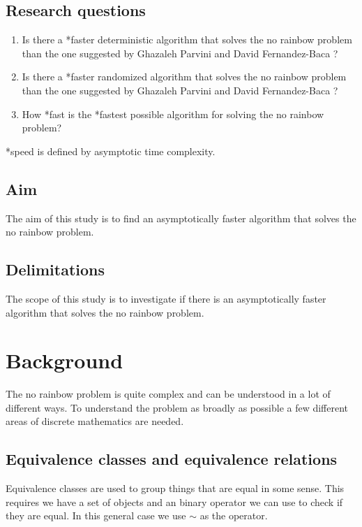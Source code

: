 \documentclass{report}
\begin{document}
\section{Research questions}
\begin{enumerate}
  \item Is there a *faster deterministic algorithm that solves the no rainbow problem than the one suggested by Ghazaleh Parvini and David Fernandez-Baca \cite{sourceNoRainbow}?
  \item Is there a *faster randomized algorithm that solves the no rainbow problem than the one suggested by Ghazaleh Parvini and David Fernandez-Baca \cite{sourceNoRainbow}?
  \item How *fast is the *fastest possible algorithm for solving the no rainbow problem?
\end{enumerate}
*speed is defined by asymptotic time complexity.

\section{Aim}
The aim of this study is to find an asymptotically faster algorithm that solves
the no rainbow problem.

\section{Delimitations}
The scope of this study is to investigate if there is an asymptotically faster
algorithm that solves the no rainbow problem.
\chapter{Background}
The no rainbow problem is quite complex and can be understood in a lot of different ways.
To understand the problem as broadly as possible a few different areas of discrete mathematics are needed.

\section{Equivalence classes and equivalence relations}
Equivalence classes are used to group things that are equal in some sense.
This requires we have a set of objects and an binary operator we can use to check if they are equal.
In this general case we use $\sim$ as the operator.
\end{document}
